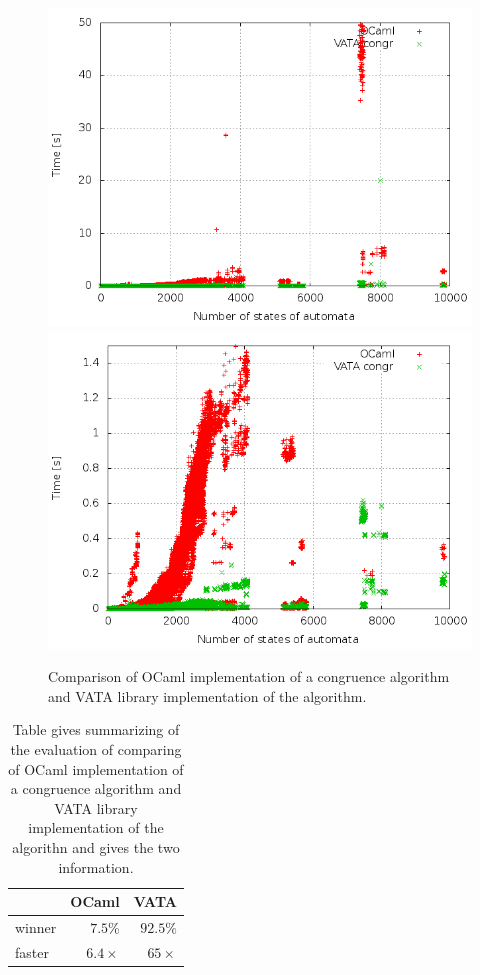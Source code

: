 \begin{figure}[bt]
\begin{center}
\includegraphics[scale=0.3]{fig/plot_hkc_zprava.png}
\includegraphics[scale=0.3]{fig/plot_hkc_step_zprava.png}
\caption{
Comparison of OCaml implementation of a congruence algorithm and VATA library implementation of the algorithm.}
\label{fig:figGraphOCaml}
\end{center}
\end{figure}

\begin{center}
\begin{table}
\begin{center}
  \begin{tabular}{ | l | r | r |}
   \hline
    & \textbf{OCaml} & \textbf{VATA} \\ \hline \hline
    winner & $7.5\%$ & $92.5\%$ \\ \hline
    faster & $6.4\times$ & $65\times$ \\ \hline
   \end{tabular}
   \caption{Table gives summarizing of the evaluation of comparing of OCaml implementation of a congruence algorithm and VATA library implementation 
     of the algorithn and gives the two information.}
   \label{tabOcaml}
\end{center}
\end{table}
\end{center}

